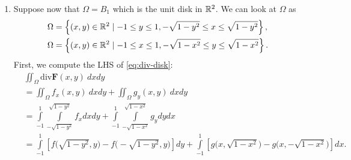 \begin{problem}
\begin{solution}
\begin{enumerate}
\begin{align*}
        &= \displaystyle\int_{I_1}\mathbf{F}\cdot n_1 \ dS + \displaystyle\int_{I_2}\mathbf{F}\cdot n_2 \ dS + \displaystyle\int_{I_3}\mathbf{F}\cdot n_3\ dS + 
        \displaystyle\int_{I_4}\mathbf{F}\cdot n_4\ dS \\
        &= -\displaystyle\int_a^b g(x,c) \ dx + \displaystyle\int_c^d f(b,y) \ dy + \displaystyle\int_a^b g(x,d) \ dx -
        \displaystyle\int_c^d f(a,y) dy.
    \end{align*}
    Besides, we also have 
    \begin{align*}
        &\displaystyle\iint_{\Omega} \mathrm{div}\mathbf{F}(x,y)\ dx dy =    \displaystyle\int_a^b \int_c^d \mathrm{div}\mathbf{F}(x,y)\ dx dy \\
        &=\displaystyle\int_a^b \int_c^d f_x (x,y)\ dxdy + \displaystyle\int_a^b \int_c^d g_y (x,y) \ dxdy \\
        &= \displaystyle\int_c^d \left( \int_a^b f_x (x,y) \ dx \right) dy + \displaystyle\int_a^b \left( \int_c^d g_y (x,y) \ dy \right) dx \\
        &= \displaystyle\int_c^d \big[f(b,y) - f(a,y)\big] dy + \displaystyle\int_a^b \big[g(x,d) - g(x,c)\big] dx \\
        &= \displaystyle\int_{\partial\Omega}\mathbf{F}\cdot \nu\ dS(x,y).
    \end{align*}
    \item[(b)] Suppose now that $\Omega = B_1$ which is the unit disk in $\mathbb{R}^2$. 
    We can look at $\Omega$ as 
    \begin{align*}
    \Omega &= \left\{ (x,y)\in \mathbb{R}^2 \mid -1\le y \le 1, -\sqrt{1-y^2} \le x \le \sqrt{1-y^2}\right\}, \\
    \Omega &= \left\{ (x,y)\in \mathbb{R}^2 \mid -1\le x \le 1, -\sqrt{1-x^2} \le y \le \sqrt{1-x^2} \right\}.
    \end{align*}
    First, we compute the LHS of \eqref{eq:div-disk}:
    \begin{align*}
        &\displaystyle\iint_{\Omega} \mathrm{div}\mathbf{F}(x,y)\ dxdy  \\
        &= \displaystyle\iint_{\Omega} f_x (x,y)\ dxdy + \displaystyle\iint_{\Omega} g_y(x,y) \ dxdy \\
        &= \displaystyle\int\limits_{-1}^1 \displaystyle\int\limits_{-\sqrt{1-y^2}}^{\sqrt{1-y^2}} f_x dxdy + \displaystyle\int\limits_{-1}^1 \displaystyle\int\limits_{-\sqrt{1-x^2}}^{\sqrt{1-x^2}} g_y dydx \\
        &= \displaystyle\int\limits_{-1}^1 \left[ f\Big(\sqrt{1-y^2},y\Big) - f\Big( -\sqrt{1-y^2},y\Big) \right] dy + \displaystyle\int\limits_{-1}^1 \left[ g\Big(x,\sqrt{1-x^2}\Big) - g\Big(x, -\sqrt{1-x^2}\Big) \right] dx.

\end{align*}
\end{enumerate}
\end{solution}
\end{problem}
